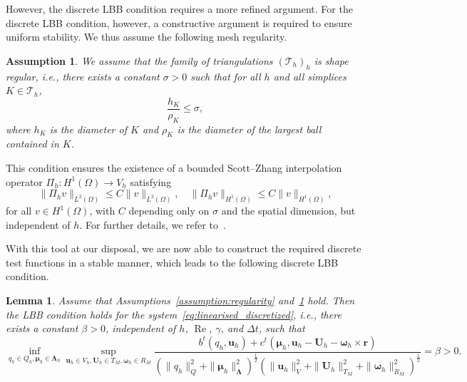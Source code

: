 \documentclass{article}
\newcommand{\bU}{{\mathbf{U}}}
\newcommand{\bu}{{\mathbf{u}}}
\newcommand{\bomega}{{\boldsymbol{\omega}}}
\newcommand{\Reynolds}{{\operatorname{Re}}}
\newtheorem{lemma}[theorem]{Lemma}
\newtheorem{assumption}[theorem]{Assumption}
\begin{document}
However, the discrete LBB condition requires a more refined argument. 
For the discrete LBB condition, however, a constructive argument is required to ensure uniform stability. 
We thus assume the following mesh regularity.

\begin{assumption}\label{assumption:mesh}
    We assume that the family of triangulations $(\mathcal{T}_h)_h$ is shape regular, i.e., there exists a constant $\sigma > 0$ such that for all $h$ and all simplices $K \in \mathcal{T}_h$,
    \[
    \frac{h_K}{\rho_K} \leq \sigma,
    \]
    where $h_K$ is the diameter of $K$ and $\rho_K$ is the diameter of the largest ball contained in $K$. 
\end{assumption}

This condition ensures the existence of a bounded Scott--Zhang interpolation operator $\Pi_h: H^1(\Omega) \to V_h$ satisfying
\[
\|\Pi_h v\|_{L^2(\Omega)} \leq C \|v\|_{L^2(\Omega)}, \quad
\|\Pi_h v\|_{H^1(\Omega)} \leq C \|v\|_{H^1(\Omega)},
\]
for all $v \in H^1(\Omega)$, with $C$ depending only on $\sigma$ and the spatial dimension, but independent of $h$. For further details, we refer to~\cite{scott1990finite,brenner2008mathematical}.

With this tool at our disposal, we are now able to construct the required discrete test functions in a stable manner, which leads to the following discrete LBB condition.
\begin{lemma}\label{thm:lbb_discrete}
    Assume that Assumptions~\ref{assumption:regularity} and~\ref{assumption:mesh} hold.
    Then the LBB condition holds for the system~\eqref{eq:linearised_discretized}, i.e., there exists a constant $\beta > 0$, independent of $h$, $\Reynolds$, $\gamma$, and $\Delta t$, such that
    \begin{equation}
        \inf_{{q}_h\in Q_h, \boldsymbol{\mu}_h\in \boldsymbol{\Lambda}_h} \sup_{\bu_h\in V_h,{\bU}_h\in T_M,{\bomega}_h\in R_M} \frac{{b}^t({q}_h,\bu_h)+{c}^t({\boldsymbol{\mu}}_h,\bu_h - {\bU}_h - {\bomega}_h\times\mathbf{r})}{(\|{q}_h\|_Q^2+\|{\boldsymbol{\mu}}_h\|_{\boldsymbol{\Lambda}}^2)^\frac12 (\|\bu_h\|_V^2 + \|{\bU}_h\|_{T_M}^2 + \|{\bomega}_h\|_{R_M}^2)^\frac12} = \beta > 0.
    \end{equation}
\end{lemma}
\end{document}
